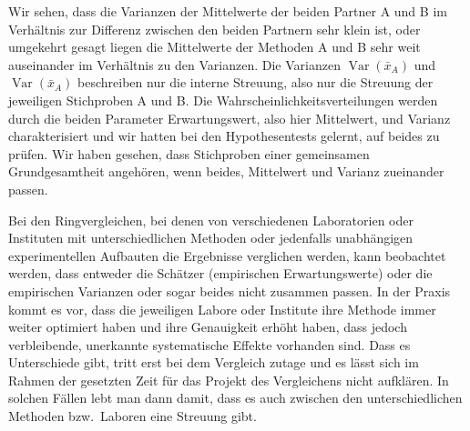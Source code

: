 Wir sehen, dass die Varianzen der Mittelwerte der beiden Partner A und B im Verhältnis zur
Differenz zwischen den beiden Partnern sehr klein ist, oder umgekehrt gesagt liegen die 
Mittelwerte der Methoden A und B sehr weit auseinander im Verhältnis zu den Varianzen.
Die Varianzen $\operatorname{Var}(\bar x_A)$ und $\operatorname{Var}(\bar x_A)$ beschreiben
nur die interne Streuung, also nur die Streuung der jeweiligen Stichproben A und B.
Die Wahrscheinlichkeitsverteilungen werden durch die beiden Parameter Erwartungswert,
also hier Mittelwert, und Varianz charakterisiert und wir hatten bei den Hypothesentests
gelernt, auf beides zu prüfen. Wir haben gesehen, dass Stichproben einer gemeinsamen
Grundgesamtheit angehören, wenn beides, Mittelwert und Varianz zueinander passen.

Bei den Ringvergleichen, bei denen von verschiedenen Laboratorien oder Instituten mit
unterschiedlichen Methoden oder jedenfalls unabhängigen experimentellen Aufbauten die
Ergebnisse verglichen werden, kann beobachtet werden, dass entweder die
Schätzer (empirischen Erwartungswerte) oder die empirischen Varianzen oder sogar
beides nicht zusammen passen. In der Praxis kommt es vor, dass die jeweiligen
Labore oder Institute ihre Methode immer weiter optimiert haben und ihre Genauigkeit
erhöht haben, dass jedoch verbleibende, unerkannte systematische Effekte vorhanden sind.
Dass es Unterschiede gibt, tritt erst bei dem Vergleich zutage und es lässt sich
im Rahmen der gesetzten Zeit für das Projekt des Vergleichens nicht aufklären.
In solchen Fällen lebt man dann damit, dass es auch zwischen den unterschiedlichen
Methoden bzw.\ Laboren eine Streuung gibt.

